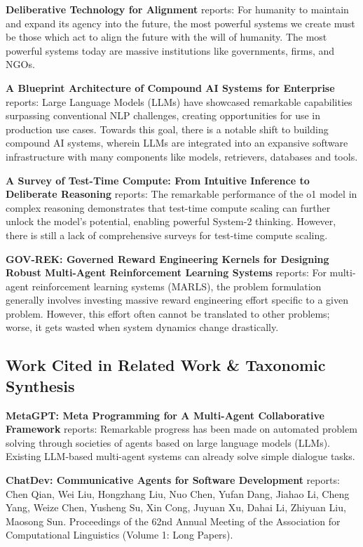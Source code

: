 \documentclass[10pt,twocolumn,letterpaper]{article}
\begin{document}
\textbf{Deliberative Technology for Alignment} \cite{arxiv_2312_03893} reports: For humanity to maintain and expand its agency into the future, the most powerful systems we create must be those which act to align the future with the will of humanity. The most powerful systems today are massive institutions like governments, firms, and NGOs.

\textbf{A Blueprint Architecture of Compound AI Systems for Enterprise} \cite{arxiv_2406_00584} reports: Large Language Models (LLMs) have showcased remarkable capabilities surpassing conventional NLP challenges, creating opportunities for use in production use cases. Towards this goal, there is a notable shift to building compound AI systems, wherein LLMs are integrated into an expansive software infrastructure with many components like models, retrievers, databases and tools.

\textbf{A Survey of Test-Time Compute: From Intuitive Inference to Deliberate Reasoning} \cite{arxiv_2501_02497} reports: The remarkable performance of the o1 model in complex reasoning demonstrates that test-time compute scaling can further unlock the model's potential, enabling powerful System-2 thinking. However, there is still a lack of comprehensive surveys for test-time compute scaling.

\textbf{GOV-REK: Governed Reward Engineering Kernels for Designing Robust Multi-Agent Reinforcement Learning Systems} \cite{arxiv_2404_01131} reports: For multi-agent reinforcement learning systems (MARLS), the problem formulation generally involves investing massive reward engineering effort specific to a given problem. However, this effort often cannot be translated to other problems; worse, it gets wasted when system dynamics change drastically.


\subsection{Work Cited in Related Work \& Taxonomic Synthesis}


\textbf{MetaGPT: Meta Programming for A Multi-Agent Collaborative Framework} \cite{crossref_10_48550_arxiv_2308_00352} reports: Remarkable progress has been made on automated problem solving through societies of agents based on large language models (LLMs). Existing LLM-based multi-agent systems can already solve simple dialogue tasks.

\textbf{ChatDev: Communicative Agents for Software Development} \cite{crossref_10_18653_v1_2024_acl_long_810} reports: Chen Qian, Wei Liu, Hongzhang Liu, Nuo Chen, Yufan Dang, Jiahao Li, Cheng Yang, Weize Chen, Yusheng Su, Xin Cong, Juyuan Xu, Dahai Li, Zhiyuan Liu, Maosong Sun. Proceedings of the 62nd Annual Meeting of the Association for Computational Linguistics (Volume 1: Long Papers).
\end{document}
